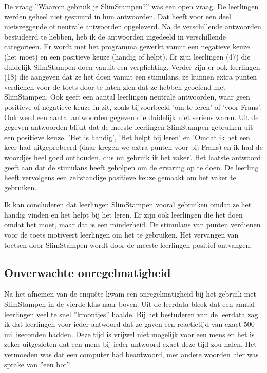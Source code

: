 \documentclass[12pt, a4paper]{article}
\begin{document}
De vraag ''Waarom gebruik je SlimStampen?'' was een open vraag. De leerlingen werden geheel niet gestuurd in hun antwoorden. Dat heeft voor een deel nietszeggende of neutrale antwoorden opgeleverd. Na de verschillende antwoorden bestudeerd te hebben, heb ik de antwoorden ingedeeld in verschillende categorieën. Er wordt met het programma gewerkt vanuit een negatieve keuze (het moet) en een positieve keuze (handig of helpt). Er zijn leerlingen (47) die duidelijk SlimStampen doen vanuit een verplichting. Verder zijn er ook leerlingen (18) die aangeven dat ze het doen vanuit een stimulans, ze kunnen extra punten verdienen voor de toets door te laten zien dat ze hebben geoefend met SlimStampen. Ook geeft een aantal leerlingen neutrale antwoorden, waar geen positieve of negatieve keuze in zit, zoals bijvoorbeeld 'om te leren' of 'voor Frans'. Ook werd een aantal antwoorden gegeven die duidelijk niet serieus waren. Uit de gegeven antwoorden blijkt dat de meeste leerlingen SlimStampen gebruiken uit een positieve keuze. 'Het is handig', 'Het helpt bij leren' en 'Omdat ik het een keer had uitgeprobeerd (daar kregen we extra punten voor bij Frans) en ik had de woordjes heel goed onthouden, dus nu gebruik ik het vaker'. Het laatste antwoord geeft aan dat de stimulans heeft geholpen om de ervaring op te doen. De leerling heeft vervolgens een zelfstandige positieve keuze gemaakt om het vaker te gebruiken.

Ik kan concluderen dat leerlingen SlimStampen vooral gebruiken omdat ze het handig vinden en het helpt bij het leren. Er zijn ook leerlingen die het doen omdat het moet, maar dat is een minderheid. De stimulans van punten verdienen voor de toets motiveert leerlingen om het te gebruiken. Het vervangen van toetsen door SlimStampen wordt door de meeste leerlingen positief ontvangen.

\subsection{Onverwachte onregelmatigheid}
Na het afnemen van de enquête kwam een onregelmatigheid bij het gebruik met SlimStampen in de vierde klas naar boven. Uit de leerdata bleek dat een aantal leerlingen veel te snel ''kroontjes'' haalde. Bij het bestuderen van de leerdata zag ik dat leerlingen voor ieder antwoord dat ze gaven een reactietijd van exact 500 milliseconden hadden. Deze tijd is vrijwel niet mogelijk voor een mens en het is zeker uitgesloten dat een mens bij ieder antwoord exact deze tijd zou halen. Het vermoeden was dat een computer had beantwoord, met andere woorden hier was sprake van ''een bot''. 
\end{document}
